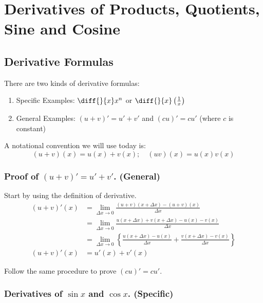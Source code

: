 

\chapter{Derivatives of Products, Quotients, Sine and Cosine}  

\bigbreak
\section{Derivative Formulas}

There are two kinds of derivative formulas:

\begin{enumerate}
\item Specific Examples: $\diff{}{x} x^n$ or $\diff{}{x} \left( \frac{1}{x} \right) $
\item General Examples: $(u+v)' = u' + v'$ and $(cu)' = cu'$ (where $c$ is constant)
\end{enumerate}

A notational convention we will use today is:
$$(u+v)(x) = u(x) + v(x); \quad (uv)(x) = u(x)v(x)$$ 

\subsection{Proof of $(u+v)' = u'+v'$. (General)}

Start by using the definition of derivative.
\begin{equation*}
\begin{split}
	(u+v)'(x)	& = \lim_{\Delta x \to 0} \frac{(u+v)(x+\Delta x) - (u+v)(x)}{\Delta x} \\
				& = \lim_{\Delta x \to 0} \frac{u(x+\Delta x)+v(x+\Delta x) - u(x) - v(x)}{\Delta x} \\
				& = \lim_{\Delta x \to 0} \left\{ \frac{u(x+\Delta x) - u(x)}{\Delta x} + \frac{v(x+\Delta x) - v(x)}{\Delta x} \right\} \\
	(u+v)'(x)	& = u'(x) + v'(x)
\end{split}
\end{equation*}

Follow the same procedure to prove $(cu)' = cu'$.

\subsection{Derivatives of $\sin x$ and $\cos x$. (Specific)}

